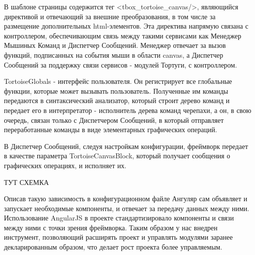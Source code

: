 В шаблоне страницы содержится тег <tbox\_tortoise\_canvas/>, являющийся директивой  и отвечающий за внешние преобразования, в том числе за размещение дополнительных html-элементов. Эта директива напрямую связана с контроллером, обеспечивающим связь между такими сервисами как Менеджер Мышиных Команд  и Диспетчер Сообщений. Менеджер отвечает за вызов функций, подписанных на события мыши в области canvas, а Диспетчер Сообщений за поддержку связи сервисов - модулей Тортуги, с контроллером.

TortoiseGlobals - интерфейс пользователя. Он регистрирует все глобальные функции, которые может вызывать пользователь. Полученные им команды передаются в синтаксический анализатор, который строит дерево команд и передает его в интерпретатор - исполнитель дерева команд черепахи, а он, в свою очередь,  связан только с Диспетчером Сообщений, в который отправляет переработанные команды в виде элементарных графических операций.

В Диспетчер Сообщений, следуя настройкам конфигурации, фреймворк передает в качестве параметра TortoiseCanvasBlock, который получает сообщения о графических операциях, и исполняет их.

\vspace{6mm}
ТУТ СХЕМКА
\vspace{6mm}

Описав такую зависимость в конфигурационном файле Ангуляр сам объявляет и запускает необходимые компоненты, и отвечает за передачу данных между ними. Использование AngularJS в проекте стандартизировало компоненты и связи между ними с точки зрения фреймворка. Таким образом у нас внедрен инструмент, позволяющий расширять проект и управлять модулями заранее декларированным образом, что делает рост проекта более управляемым.


\clearpage